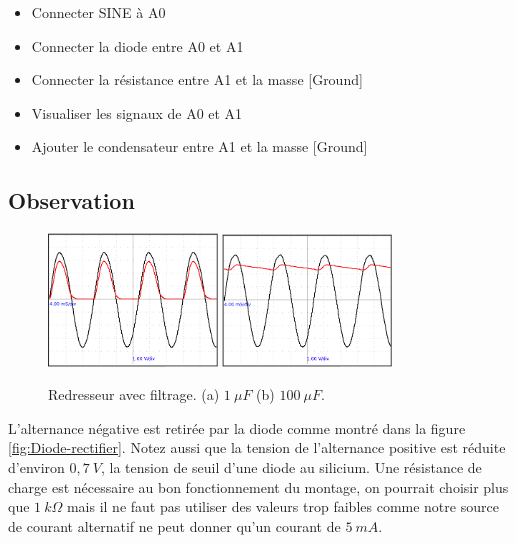 \documentclass{book}
\begin{document}
\begin{itemize}
  \item Connecter SINE à A0
  \item Connecter la diode entre A0 et A1
  \item Connecter la résistance entre A1 et la masse [Ground]
  \item Visualiser les signaux de A0 et A1
  \item Ajouter le condensateur entre A1 et la masse [Ground]
\end{itemize}

\subsection{Observation}


\begin{figure}[h!]
\begin{center}
\caption{\label{fig:Rectifier-with-Filter}Redresseur avec filtrage. (a) $1\ \mu F$ (b) $100\ \mu F$. }\vspace{0.5em}
\includegraphics[width=0.4\textwidth, height=0.3\textwidth, keepaspectratio]{Schematic-diode-halfwave-1uF.png}
\includegraphics[width=0.4\textwidth, height=0.3\textwidth, keepaspectratio]{Pic-diode-halfwave-100uF.png}
\end{center}
\end{figure}



L'alternance négative est retirée par la diode comme montré dans la figure  \ref{fig:Diode-rectifier}. Notez aussi que la tension de l'alternance positive est réduite d'environ $0,7\ V$, la tension de seuil d'une diode au silicium. Une résistance de charge est nécessaire au bon fonctionnement du montage, on pourrait choisir plus que $1\ k\Omega$  mais il ne faut pas utiliser des valeurs trop faibles comme notre source de courant alternatif ne peut donner qu'un courant de $5\ mA$.
\end{document}
